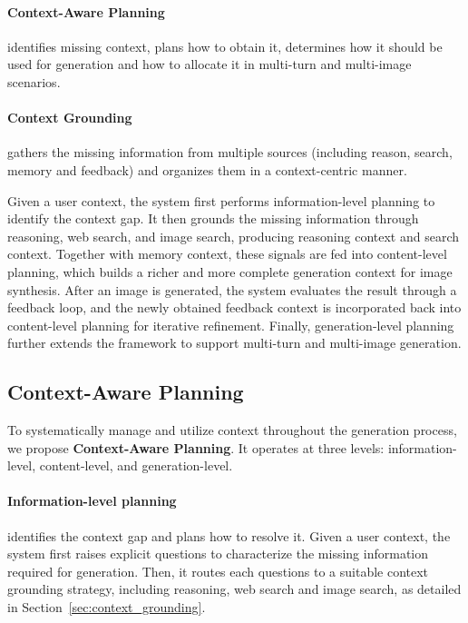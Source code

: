 \documentclass{llmxive}
\begin{document}
\paragraph{Context-Aware Planning} identifies missing context, plans how to obtain it, determines how it should be used for generation and how to allocate it in multi-turn and multi-image scenarios.

\paragraph{Context Grounding} gathers the missing information from multiple sources (including reason, search, memory and feedback) and organizes them in a context-centric manner.

Given a user context, the system first performs information-level planning to identify the context gap. It then grounds the missing information through reasoning, web search, and image search, producing reasoning context and search context. Together with memory context, these signals are fed into content-level planning, which builds a richer and more complete generation context for image synthesis. After an image is generated, the system evaluates the result through a feedback loop, and the newly obtained feedback context is incorporated back into content-level planning for iterative refinement. Finally, generation-level planning further extends the framework to support multi-turn and multi-image generation.

\subsection{Context-Aware Planning}

To systematically manage and utilize context throughout the generation process, we propose \textbf{Context-Aware Planning}. It operates at three levels: information-level, content-level, and generation-level.

\paragraph{Information-level planning} identifies the context gap and plans how to resolve it. Given a user context, the system first raises explicit questions to characterize the missing information required for generation. Then, it routes each questions to a suitable context grounding strategy, including reasoning, web search and image search, as detailed in Section~\ref{sec:context_grounding}.
\end{document}

